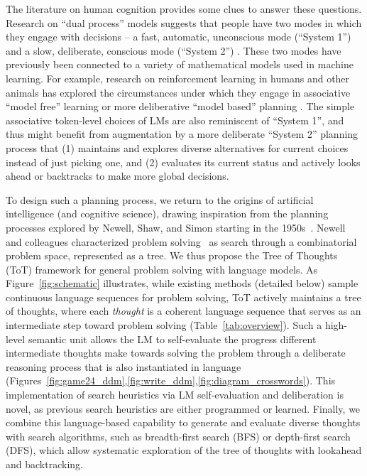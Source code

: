 The literature on human cognition provides some clues to answer these questions. Research on ``dual process'' models suggests that people have two modes in which they engage with decisions -- a fast, automatic, unconscious mode (``System 1'') and a slow, deliberate, conscious mode (``System 2'') \cite{sloman1996empirical,stanovich1999rational,kahneman2002representativeness,kahneman2011thinking}. These two modes have previously been connected to a variety of mathematical models used in machine learning. For example, research on reinforcement learning in humans and other animals has explored the circumstances under which they engage in associative ``model free'' learning or more deliberative ``model based'' planning \cite{daw2005uncertainty}. The simple associative token-level choices of LMs are also reminiscent of ``System 1'', and thus might benefit from augmentation by a more deliberate ``System 2'' planning process that (1) maintains and explores diverse alternatives for current choices instead of just picking one, and (2) evaluates its current status and actively looks ahead or backtracks to make more global decisions.

To design such a planning process, we return to the origins of artificial intelligence (and cognitive science), drawing inspiration from the planning processes explored by Newell, Shaw, and Simon starting in the 1950s~\cite{newell1959report,newell1972human}. Newell and colleagues characterized problem solving~\cite{newell1959report} as search through a combinatorial problem space, represented as a tree.  We thus propose the Tree of Thoughts (ToT) framework for general problem solving with language models. As Figure~\ref{fig:schematic} illustrates, while existing methods (detailed below) sample continuous language sequences for problem solving, ToT actively maintains a tree of thoughts, where each {\em thought} is a coherent language sequence that serves as an intermediate step toward problem solving (Table~\ref{tab:overview}). Such a high-level semantic unit allows the LM to self-evaluate the progress different intermediate thoughts make towards  solving the problem through a deliberate reasoning process that is also instantiated in language (Figures~\ref{fig:game24_ddm},\ref{fig:write_ddm},\ref{fig:diagram_crosswords}). This implementation of search heuristics via LM self-evaluation and deliberation is novel, as previous search heuristics are either programmed or learned. Finally, we combine this language-based capability to generate and evaluate diverse thoughts with search algorithms, such as breadth-first search (BFS) or depth-first search (DFS), which allow systematic exploration of the tree of thoughts with lookahead and backtracking.

